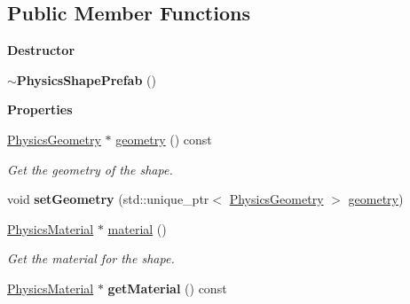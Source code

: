 \subsection*{Public Member Functions}
\begin{Indent}\textbf{ Destructor}\par
\begin{DoxyCompactItemize}
\item 
\mbox{\label{classrev_1_1_physics_shape_prefab_ad745a75813e9574868c1bed29d0ddaeb}} 
{\bfseries $\sim$\+Physics\+Shape\+Prefab} ()
\end{DoxyCompactItemize}
\end{Indent}
\begin{Indent}\textbf{ Properties}\par
\begin{DoxyCompactItemize}
\item 
\mbox{\label{classrev_1_1_physics_shape_prefab_af8ec025e86caef3a7ab7bcfae5254aef}} 
\mbox{\hyperlink{classrev_1_1_physics_geometry}{Physics\+Geometry}} $\ast$ \mbox{\hyperlink{classrev_1_1_physics_shape_prefab_af8ec025e86caef3a7ab7bcfae5254aef}{geometry}} () const
\begin{DoxyCompactList}\small\item\em Get the geometry of the shape. \end{DoxyCompactList}\item 
\mbox{\label{classrev_1_1_physics_shape_prefab_adc7e4e30d814c1501f33097496939b73}} 
void {\bfseries set\+Geometry} (std\+::unique\+\_\+ptr$<$ \mbox{\hyperlink{classrev_1_1_physics_geometry}{Physics\+Geometry}} $>$ \mbox{\hyperlink{classrev_1_1_physics_shape_prefab_af8ec025e86caef3a7ab7bcfae5254aef}{geometry}})
\item 
\mbox{\label{classrev_1_1_physics_shape_prefab_ae547f85cd93185ef6701d08ef978bd4e}} 
\mbox{\hyperlink{classrev_1_1_physics_material}{Physics\+Material}} $\ast$ \mbox{\hyperlink{classrev_1_1_physics_shape_prefab_ae547f85cd93185ef6701d08ef978bd4e}{material}} ()
\begin{DoxyCompactList}\small\item\em Get the material for the shape. \end{DoxyCompactList}\item 
\mbox{\label{classrev_1_1_physics_shape_prefab_a2d566261e6c2f92bc4a4c44914bbad37}} 
\mbox{\hyperlink{classrev_1_1_physics_material}{Physics\+Material}} $\ast$ {\bfseries get\+Material} () const
\end{DoxyCompactItemize}
\end{Indent}

